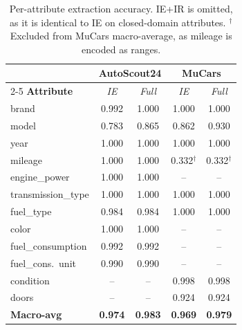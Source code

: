 \documentclass[conference]{IEEEtran}
\begin{document}
\begin{table}[htbp]
\caption{Per-attribute extraction accuracy. IE+IR is omitted, as
it is identical to IE on closed-domain attributes.
$^\dagger$Excluded from MuCars macro-average, as mileage is
encoded as ranges.}
\begin{center}
\footnotesize
\setlength{\tabcolsep}{5pt}
\begin{tabular}{|l|cc|cc|}
\hline
 & \multicolumn{2}{c|}{\textbf{AutoScout24}}
 & \multicolumn{2}{c|}{\textbf{MuCars}} \\
\cline{2-5}
\textbf{Attribute} & \textit{IE} & \textit{Full}
                   & \textit{IE} & \textit{Full} \\
\hline
brand                     & 0.992 & 1.000          & 1.000          & 1.000          \\
model                     & 0.783 & 0.865          & 0.862          & 0.930          \\
year                      & 1.000 & 1.000          & 1.000          & 1.000          \\
mileage                   & 1.000 & 1.000          & 0.332$^\dagger$ & 0.332$^\dagger$ \\
engine\_power             & 1.000 & 1.000          & --             & --             \\
transmission\_type        & 1.000 & 1.000          & 1.000          & 1.000          \\
fuel\_type                & 0.984 & 0.984          & 1.000          & 1.000          \\
color                     & 1.000 & 1.000          & --             & --             \\
fuel\_consumption         & 0.992 & 0.992          & --             & --             \\
fuel\_cons.\ unit         & 0.990 & 0.990          & --             & --             \\
condition                 & --    & --             & 0.998          & 0.998          \\
doors                     & --    & --             & 0.924          & 0.924          \\
\hline
\textbf{Macro-avg}        & \textbf{0.974} & \textbf{0.983}
                          & \textbf{0.969} & \textbf{0.979} \\
\hline
\end{tabular}
\label{tab:extraction}
\end{center}
\end{table}
\end{document}
